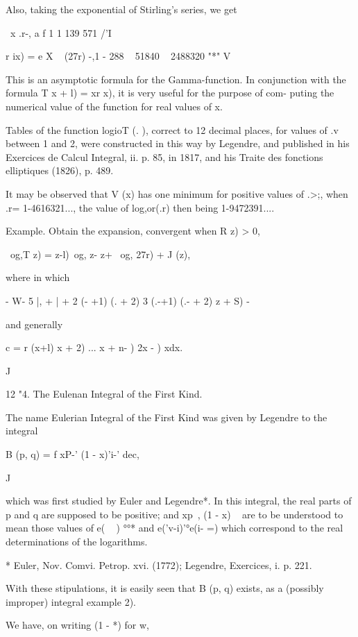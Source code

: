 Also, taking the exponential of Stirling's series, we get

\ x .r-, a f 1 1 139 571 /'I

r ix) = e X ~ (27r) -,1 - 288 ~ 51840 ~ 2488320 "*" V

This is an asymptotic formula for the Gamma-function. In conjunction
with the formula T x + l) = xr x), it is very useful for the purpose
of com- puting the numerical value of the function for real values of
x.

Tables of the function logioT (. ), correct to 12 decimal places, for
values of .v between 1 and 2, were constructed in this way by
Legendre, and published in his Exercices de Calcul Integral, ii. p.
85, in 1817, and his Traite des fonctions elliptiques (1826), p. 489.

It may be observed that V (x) has one minimum for positive values of
.>;, when .r= 1-4616321..., the value of log,or(.r) then being
1-9472391....

Example. Obtain the expansion, convergent when R z) > 0,

\ og,T z) = z-l)\ og, z- z+ \ og, 27r) + J (z),

where in which

- W- 5 |, + | + 2 (- +1) (. + 2) 3 (.-+1) (.- + 2) z + S) -

and generally

c = r (x+l) x + 2) ... x + n- ) 2x - ) xdx. 

J

12 "4. The Eulenan Integral of the First Kind.

The name Eulerian Integral of the First Kind was given by Legendre to
the integral

B (p, q) = f xP-' (1 - x)'i-' dec,

J

which was first studied by Euler and Legendre*. In this integral, the
real parts of p and q are supposed to be positive; and xp~, (1 - x) ~
are to be understood to mean those values of e( ~ ) °°* and
e('v-i)'°e(i- =) which correspond to the real determinations of the
logarithms.

* Euler, Nov. Comvi. Petrop. xvi. (1772); Legendre, Exercices, i. p.
221.

%
%

With these stipulations, it is easily seen that B (p, q) exists, as a
(possibly improper) integral  example 2).

We have, on writing (1 - *) for w,

